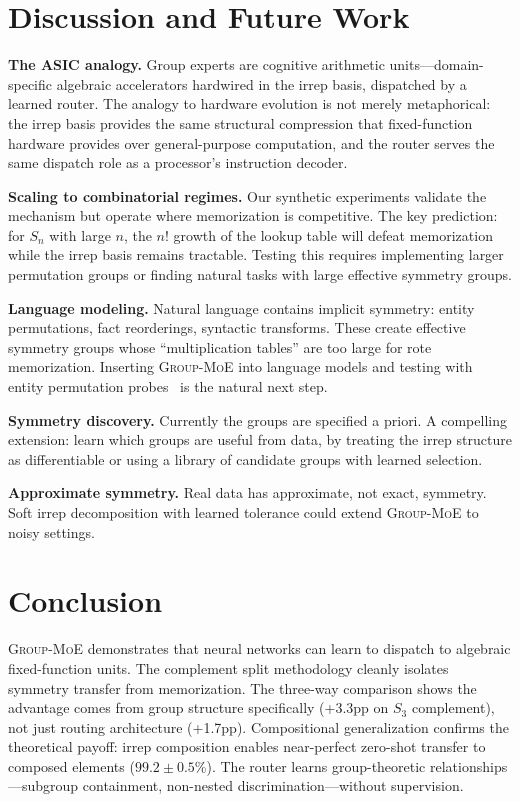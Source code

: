 \documentclass[10pt, letterpaper]{article}
\newcommand{\gmoe}{\textsc{Group-MoE}}
\begin{document}
\section{Discussion and Future Work}
\label{sec:discussion}

\textbf{The ASIC analogy.} Group experts are cognitive arithmetic units---domain-specific algebraic accelerators hardwired in the irrep basis, dispatched by a learned router. The analogy to hardware evolution is not merely metaphorical: the irrep basis provides the same structural compression that fixed-function hardware provides over general-purpose computation, and the router serves the same dispatch role as a processor's instruction decoder.

\textbf{Scaling to combinatorial regimes.} Our synthetic experiments validate the mechanism but operate where memorization is competitive. The key prediction: for $S_n$ with large $n$, the $n!$ growth of the lookup table will defeat memorization while the irrep basis remains tractable. Testing this requires implementing larger permutation groups or finding natural tasks with large effective symmetry groups.

\textbf{Language modeling.} Natural language contains implicit symmetry: entity permutations, fact reorderings, syntactic transforms. These create effective symmetry groups whose ``multiplication tables'' are too large for rote memorization. Inserting \gmoe{} into language models and testing with entity permutation probes~\cite{walters2025ordering} is the natural next step.

\textbf{Symmetry discovery.} Currently the groups are specified a priori. A compelling extension: learn which groups are useful from data, by treating the irrep structure as differentiable or using a library of candidate groups with learned selection.

\textbf{Approximate symmetry.} Real data has approximate, not exact, symmetry. Soft irrep decomposition with learned tolerance could extend \gmoe{} to noisy settings.

\section{Conclusion}
\label{sec:conclusion}

\gmoe{} demonstrates that neural networks can learn to dispatch to algebraic fixed-function units. The complement split methodology cleanly isolates symmetry transfer from memorization. The three-way comparison shows the advantage comes from group structure specifically (+3.3pp on $S_3$ complement), not just routing architecture (+1.7pp). Compositional generalization confirms the theoretical payoff: irrep composition enables near-perfect zero-shot transfer to composed elements ($99.2 \pm 0.5$\%). The router learns group-theoretic relationships---subgroup containment, non-nested discrimination---without supervision.
\end{document}
